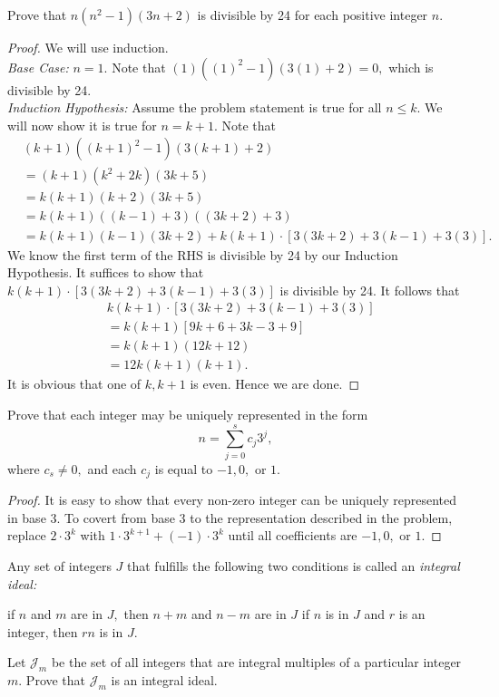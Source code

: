 \documentclass[letterpaper,oneside]{scrartcl}
\begin{document}
\begin{problem*}
  Prove that \(n(n^2-1)(3n+2)\) is divisible by 24 for each positive integer \(n\).
\end{problem*}
\begin{proof}
  We will use induction.\\
  \indent\textit{Base Case:} \(n=1.\) Note that \((1)((1)^2-1)(3(1)+2)=0,\) which is divisible by 24.\\
  \indent\textit{Induction Hypothesis:} Assume the problem statement is true for all \(n\leq k\). We will now show it is true for \(n=k+1.\) Note that\
  \begin{align*}
     & (k+1)((k+1)^2-1)(3(k+1)+2)                            \\
     & =(k+1)(k^2+2k)(3k+5)                                  \\
     & = k(k+1)(k+2)(3k+5)                                   \\
     & = k(k+1)((k-1)+3)((3k+2)+3)                           \\
     & = k(k+1)(k-1)(3k+2)+k(k+1)\cdot[3(3k+2)+3(k-1)+3(3)].
  \end{align*}
  We know the first term of the RHS is divisible by 24 by our Induction Hypothesis. It suffices to show that \(k(k+1)\cdot[3(3k+2)+3(k-1)+3(3)]\) is divisible by 24. It follows that
  \begin{align*}
     & k(k+1)\cdot[3(3k+2)+3(k-1)+3(3)] \\
     & = k(k+1)[9k+6+3k-3+9]            \\
     & = k(k+1)(12k+12)                 \\
     & = 12k(k+1)(k+1).
  \end{align*}
  It is obvious that one of \(k,k+1\) is even. Hence we are done.
\end{proof}
\begin{problem*}
  Prove that each integer may be uniquely represented in the form
  \[n=\sum_{j=0}^{s}c_j 3^j,\]
  where \(c_s\neq0,\) and each \(c_j\) is equal to \(-1,0,\) or \(1\).
\end{problem*}
\begin{proof}
  It is easy to show that every non-zero integer can be uniquely represented in base 3. To covert from base 3 to the representation described in the problem, replace \(2\cdot3^k\) with \(1\cdot3^{k+1}+(-1)\cdot3^k\) until all coefficients are \(-1,0,\) or \(1\).
\end{proof}
\begin{problem*}
  Any set of integers \(J\) that fulfills the following two conditions is called an \textit{integral ideal:}
  \begin{enumerate}
    \ii[(i)] if \(n\) and \(m\) are in \(J,\) then \(n+m\) and \(n-m\) are in \(J\)
    \ii[(ii)] if \(n\) is in \(J\) and \(r\) is an integer, then \(rn\) is in \(J.\)
  \end{enumerate}
  Let \(\mathcal{J}_m\) be the set of all integers that are integral multiples of a particular integer \(m.\) Prove that \(\mathcal{J}_m\) is an integral ideal.
\end{problem*}
\end{document}
